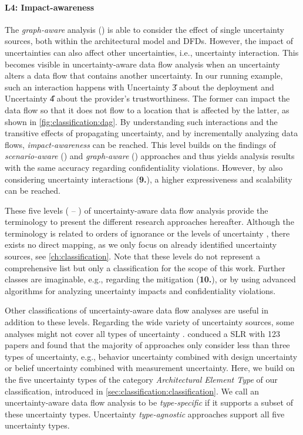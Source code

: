 \paragraph{L4: Impact-awareness}\label{awarenesslevel:4}
The \emph{graph-aware} analysis () is able to consider the effect of single uncertainty sources, both within the architectural model and \acp{DFD}.
However, the impact of uncertainties can also affect other uncertainties, i.e., uncertainty interaction.
This becomes visible in uncertainty-aware data flow analysis when an uncertainty alters a data flow that contains another uncertainty.
In our running example, such an interaction happens with Uncertainty \U{3} about the deployment and Uncertainty \U{4} about the provider's trustworthiness.
The former can impact the data flow so that it does not flow to a location that is affected by the latter, as shown in \autoref{fig:classification:dag}.
By understanding such interactions and the transitive effects of propagating uncertainty, and by incrementally analyzing data flows, \emph{impact-awareness} can be reached.
This level builds on the findings of \emph{scenario-aware} () and \emph{graph-aware} () approaches and thus yields analysis results with the same accuracy regarding confidentiality violations.
However, by also considering uncertainty interactions (\textbf{9.}), a higher expressiveness and scalability can be reached.


These five levels ( -- ) of uncertainty-aware data flow analysis provide the terminology to present the different research approaches hereafter.
Although the terminology is related to orders of ignorance \cite{armour_five_2000} or the levels of uncertainty \cite{bures_capturing_2020}, there exists no direct mapping, as we only focus on already identified uncertainty sources, see \autoref{ch:classification}.
Note that these levels do not represent a comprehensive list but only a classification for the scope of this work.
Further classes are imaginable, e.g., regarding the mitigation (\textbf{10.}), or by using advanced algorithms for analyzing uncertainty impacts and confidentiality violations.

Other classifications of uncertainty-aware data flow analyses are useful in addition to these levels.
Regarding the wide variety of uncertainty sources, some analyses might not cover all types of uncertainty \cite{troya_uncertainty_2021,PSUM}.
\textcite{troya_uncertainty_2021} conduced a \acf{SLR} with 123 papers and found that the majority of approaches only consider less than three types of uncertainty, e.g., behavior uncertainty combined with design uncertainty or belief uncertainty combined with measurement uncertainty.
Here, we build on the five uncertainty types of the category \emph{Architectural Element Type} of our classification, introduced in \autoref{sec:classification:classification}.
We call an uncertainty-aware data flow analysis to be \emph{type-specific} if it supports a subset of these uncertainty types.
Uncertainty \emph{type-agnostic} approaches support all five uncertainty types.

